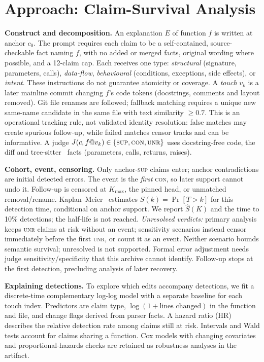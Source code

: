 \section{Approach: Claim-Survival Analysis}\label{sec:approach}

\textbf{Construct and decomposition.} An explanation $E$ of function $f$ is written at anchor $c_0$. The prompt requires each claim to be a self-contained, source-checkable fact naming $f$, with no added or merged facts, original wording where possible, and a 12-claim cap. Each receives one type: \emph{structural} (signature, parameters, calls), \emph{data-flow}, \emph{behavioural} (conditions, exceptions, side effects), or \emph{intent}. These instructions do not guarantee atomicity or coverage. A \emph{touch} $v_k$ is a later mainline commit changing $f$'s code tokens (docstrings, comments and layout removed). Git file renames are followed; fallback matching requires a unique new same-name candidate in the same file with text similarity $\ge0.7$. This is an operational tracking rule, not validated identity resolution: false matches may create spurious follow-up, while failed matches censor tracks and can be informative. A judge $J(c,f@v_k)\in\{\textsc{sup},\textsc{con},\textsc{unr}\}$ uses docstring-free code, the diff and tree-sitter~\cite{treesitter} facts (parameters, calls, returns, raises).

\textbf{Cohort, event, censoring.} Only anchor-\textsc{sup} claims enter; anchor contradictions are initial detected errors. The event is the \emph{first} \textsc{con}, so later support cannot undo it. Follow-up is censored at $K_{\max}$, the pinned head, or unmatched removal/rename. Kaplan--Meier~\cite{kaplan1958} estimates $S(k)=\Pr[T>k]$ for this detection time, conditional on anchor support. We report $\hat S(K)$ and the time to 10\% detections; the half-life is not reached. \emph{Unresolved verdicts:} primary analysis keeps \textsc{unr} claims at risk without an event; sensitivity scenarios instead censor immediately before the first \textsc{unr}, or count it as an event. Neither scenario bounds semantic survival; unresolved is not supported. Formal error adjustment needs judge sensitivity/specificity that this archive cannot identify. Follow-up stops at the first detection, precluding analysis of later recovery.

\textbf{Explaining detections.} To explore which edits accompany detections, we fit a discrete-time complementary log-log model with a separate baseline for each touch index. Predictors are claim type, $\log(1{+}\text{lines changed})$ in the function and file, and change flags derived from parser facts. A hazard ratio (HR) describes the relative detection rate among claims still at risk. Intervals and Wald tests account for claims sharing a function. Cox models with changing covariates~\cite{cox1972,andersen1982,davidson2019lifelines} and proportional-hazards checks are retained as robustness analyses in the artifact. 

